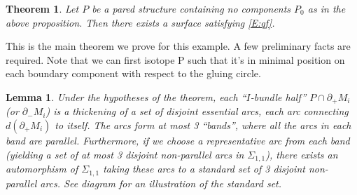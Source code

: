 \documentclass[12pt]{amsart}
\newtheorem{thm}[theorem]{Theorem}
\newtheorem{lemma}[theorem]{Lemma}
\theoremstyle{definition}
\newcommand{\bd}{\partial}
\newcommand{\Si}{\Sigma}
\begin{document}
\begin{thm}

Let $P$ be a pared structure containing no components $P_0$ as in the above
proposition. Then there exists a surface satisfying \eqref{E:qf}.

\end{thm}

This is the main theorem we prove for this example. A few preliminary facts are
required. Note that we can first isotope P such that it's in minimal position
on each boundary component with respect to the gluing circle.

\begin{lemma}

Under the hypotheses of the theorem, each ``$I$-bundle half'' $P \cap \bd_+M_i$
(or $\bd_-M_i$) is a thickening of a set of disjoint essential arcs, each arc
connecting $d(\bd_+M_i)$ to itself. The arcs form at most 3 ``bands'', where
all the arcs in each band are parallel.  Furthermore, if we choose
a representative arc from each band (yielding a set of at most 3 disjoint
non-parallel arcs in $\Si_{1,1}$), there exists an automorphism of $\Si_{1,1}$
taking these arcs to a standard set of 3 disjoint non-parallel arcs.  See
diagram for an illustration of the standard set.

\end{lemma}
\end{document}
